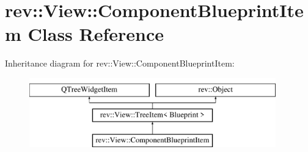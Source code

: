 \hypertarget{classrev_1_1_view_1_1_component_blueprint_item}{}\section{rev\+::View\+::Component\+Blueprint\+Item Class Reference}
\label{classrev_1_1_view_1_1_component_blueprint_item}
Inheritance diagram for rev\+::View\+::Component\+Blueprint\+Item\+:\begin{figure}[H]
\begin{center}
\leavevmode
\includegraphics[height=3.000000cm]{classrev_1_1_view_1_1_component_blueprint_item}
\end{center}
\end{figure}
